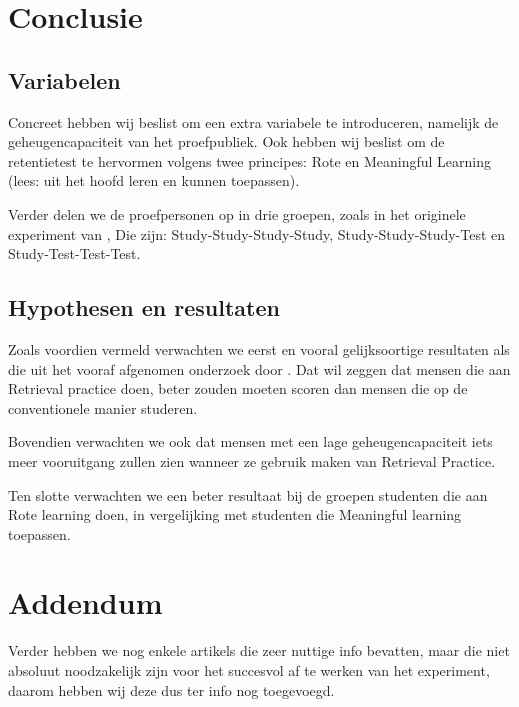 \documentclass{hogent-article}
\begin{document}
\section{Conclusie}

\subsection{Variabelen}
Concreet hebben wij beslist om een extra variabele te introduceren, namelijk de geheugencapaciteit van het proefpubliek. Ook hebben wij beslist om de retentietest te hervormen volgens twee principes: Rote en Meaningful Learning (lees: uit het hoofd leren en kunnen toepassen).\\
\par
\noindent    
Verder delen we de proefpersonen op in drie groepen, zoals in het originele experiment van \textcite{Roediger_2006} , Die zijn: Study-Study-Study-Study, Study-Study-Study-Test  en Study-Test-Test-Test. 

\subsection{Hypothesen en resultaten}

\noindent
Zoals voordien vermeld verwachten we eerst en vooral gelijksoortige resultaten als die uit het vooraf afgenomen onderzoek door \textcite{Roediger_2006}. Dat wil zeggen dat mensen die aan Retrieval practice doen, beter zouden moeten scoren dan mensen die op de conventionele manier studeren.\\
\par
\noindent
Bovendien verwachten we ook dat mensen met een lage geheugencapaciteit iets meer vooruitgang zullen zien wanneer ze gebruik maken van Retrieval Practice.\\
\par
\noindent
Ten slotte verwachten we een beter resultaat bij de groepen studenten die aan Rote learning doen, in vergelijking met studenten die Meaningful learning toepassen.



\section{Addendum}

Verder hebben we nog enkele artikels die zeer nuttige info bevatten, maar die niet absoluut noodzakelijk zijn voor het succesvol af te werken van het experiment, daarom hebben wij deze dus ter info nog toegevoegd.
\end{document}
